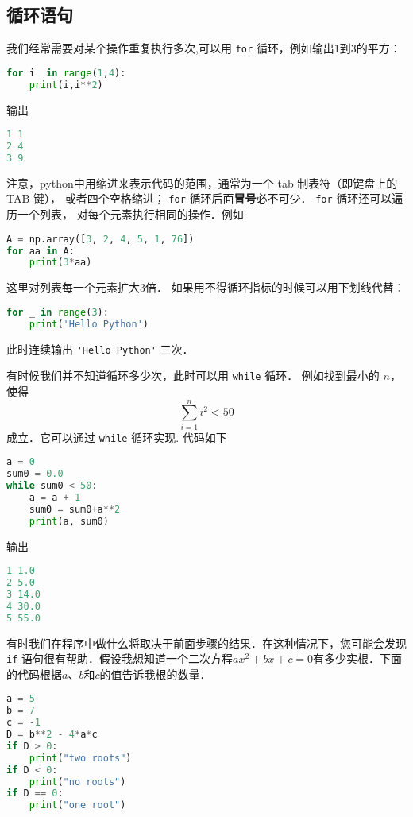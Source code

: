 \subsection{循环语句}
我们经常需要对某个操作重复执行多次,可以用 \verb|for| 循环，例如输出$1$到$3$的平方：
\begin{lstlisting}[language=python]
for i  in range(1,4):
    print(i,i**2)
\end{lstlisting}
输出
\begin{lstlisting}[language=python]
1 1
2 4
3 9
\end{lstlisting}
注意，python中用缩进来表示代码的范围，通常为一个 tab 制表符（即键盘上的 TAB 键）， 或者四个空格缩进； \verb|for| 循环后面\textbf{冒号}必不可少． \verb|for| 循环还可以遍历一个列表， 对每个元素执行相同的操作．例如
\begin{lstlisting}[language=python]
A = np.array([3, 2, 4, 5, 1, 76])
for aa in A:
    print(3*aa)
\end{lstlisting}
这里对列表每一个元素扩大3倍． 如果用不得循环指标的时候可以用下划线代替：
\begin{lstlisting}[language=python]
for _ in range(3):
    print('Hello Python')
\end{lstlisting}
此时连续输出   \verb|'Hello Python'|  三次．

有时候我们并不知道循环多少次，此时可以用 \verb|while| 循环． 例如找到最小的 $n$，使得
\begin{equation}
\sum_{i=1}^n i^2<50
\end{equation}
成立．它可以通过 \verb|while| 循环实现. 代码如下
\begin{lstlisting}[language=python]
a = 0
sum0 = 0.0
while sum0 < 50:
    a = a + 1
    sum0 = sum0+a**2
    print(a, sum0)
\end{lstlisting}
输出
\begin{lstlisting}[language=python]
1 1.0
2 5.0
3 14.0
4 30.0
5 55.0
\end{lstlisting}

有时我们在程序中做什么将取决于前面步骤的结果．在这种情况下，您可能会发现 \verb|if| 语句很有帮助．假设我想知道一个二次方程$ax^2+bx+c=0$有多少实根．下面的代码根据$a$、$b$和$c$的值告诉我根的数量．
\begin{lstlisting}[language=python]
a = 5
b = 7
c = -1 
D = b**2 - 4*a*c
if D > 0:
    print("two roots")
if D < 0:
    print("no roots")
if D == 0:
    print("one root")
\end{lstlisting}

